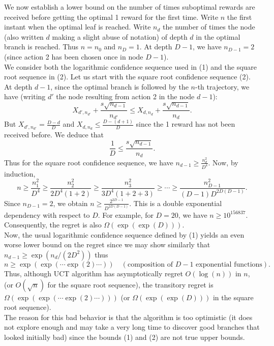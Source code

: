 \documentclass{article}
\begin{document}
We now establish a lower bound on the number of times suboptimal rewards are received before getting the optimal 1 reward for the first time. Write \(n\) the first instant when the optimal leaf is reached. Write \(n_d\) the number of times the node (also written \(d\) making a slight abuse of notation) of depth \(d\) in the optimal branch is reached. Thus \(n = n_0\) and \(n_D = 1\). At depth \(D - 1\), we have \(n_{D-1} = 2\) (since action 2 has been chosen once in node \(D - 1\)).\\
We consider both the logarithmic confidence sequence used in (1) and the square root sequence in (2). Let us start with the square root confidence sequence (2). At depth \(d - 1\), since the optimal branch is followed by the \(n\)-th trajectory, we have (writing \(d'\) the node resulting from action 2 in the node \(d - 1\)):
\[
X_{d',n_{d'}} + \frac{s\sqrt{n_{d-1}}}{n_{d'}} \leq X_{d,n_d} + \frac{s\sqrt{n_{d-1}}}{n_d}.
\]
But \(X_{d',n_{d'}} = \frac{D - d}{D}\) and \(X_{d,n_d} \leq \frac{D - (d + 1)}{D}\) since the 1 reward has not been received before. We deduce that
\[
\frac{1}{D} \leq \frac{s\sqrt{n_{d-1}}}{n_d}.
\]
Thus for the square root confidence sequence, we have \(n_{d-1} \geq \frac{n_d^2}{D^4}\). Now, by induction,
\[
n \geq \frac{n_1^2}{D^4} \geq \frac{n_2^2}{2D^4(1+2)} \geq \frac{n_3^2}{3D^4(1+2+3)} \geq \cdots \geq \frac{n_{D-1}^2}{(D-1)D^{2D(D-1)}}.
\]
Since \(n_{D-1} = 2\), we obtain \(n \geq \frac{2^{2D-1}}{D^{2D(D-1)}}\). This is a double exponential dependency with respect to \(D\). For example, for \(D = 20\), we have \(n \geq 10^{156837}\). Consequently, the regret is also \(\Omega(\exp(\exp(D)))\).\\
Now, the usual logarithmic confidence sequence defined by (1) yields an even worse lower bound on the regret since we may show similarly that \(n_{d-1} \geq \exp(n_d/(2D^2))\) thus
\[
n \geq \exp(\exp(\cdots \exp(2) \cdots)) \quad (\text{composition of } D - 1 \text{ exponential functions}).
\]
Thus, although UCT algorithm has asymptotically regret \(O(\log(n))\) in \(n\), (or \(O(\sqrt{n})\) for the square root sequence), the transitory regret is \(\Omega(\exp(\exp(\cdots \exp(2) \cdots)))\) (or \(\Omega(\exp(\exp(D)))\) in the square root sequence).\\
The reason for this bad behavior is that the algorithm is too optimistic (it does not explore enough and may take a very long time to discover good branches that looked initially bad) since the bounds (1) and (2) are not true upper bounds.\\



\end{document}
